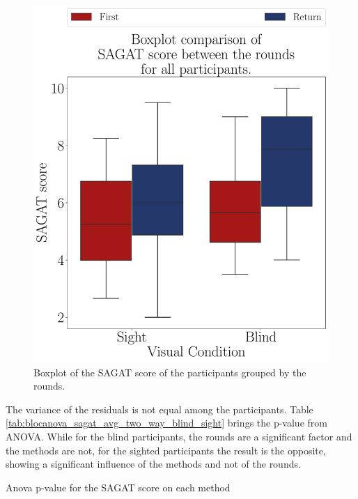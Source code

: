 \begin{figure}[!htb]
    \centering
    \includegraphics[width = 0.75\linewidth]{3 - Resultados//Figuras/boxplot_sagat_4_rounds.pdf}
    \caption{Boxplot of the SAGAT score of the participants grouped by the rounds.}
    \label{fig:boxplot_sagat_4_rounds}
\end{figure}

The variance of the residuals is not equal among the participants. Table \ref{tab:blocanova_sagat_avg_two_way_blind_sight} brings the p-value from ANOVA. While for the blind participants, the rounds are a significant factor and the methods are not, for the sighted participants the result is the opposite, showing a significant influence of the methods and not of the rounds.

\begin{table}[!htb]
    \caption{Anova p-value for the SAGAT score on each method}
    \label{tab:blocanova_sagat_avg_two_way_blind_sight}
\begin{minipage}{0.45\linewidth}
    
\end{minipage}%
\begin{minipage}{0.05\linewidth}
    \hfill
\end{minipage}%
\begin{minipage}{0.45\linewidth}
        
\end{minipage}
\end{table}